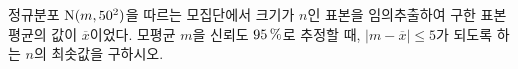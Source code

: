 정규분포 $\mathrm{N}(m{,}\mkern3mu\mathopen{}50^2)$을 따르는 모집단에서 크기가 $n$인 표본을 임의추출하여 구한 표본평균의 값이 $\overline{x}$이었다. 모평균 $m$을 신뢰도 $95\mkern3mu \%$로 추정할 때, $|m-\overline{x}|\le 5$가 되도록 하는 $n$의 최솟값을 구하시오. 

